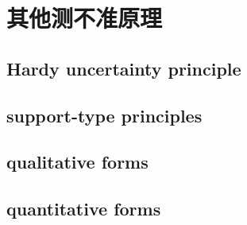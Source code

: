 \section{其他测不准原理}
\label{b2:sec:2003}


\subsection{Hardy uncertainty principle}
\label{b2:subsec:200301}

\subsection{support-type principles}
\label{b2:subsec:200302}

\subsection{qualitative forms}
\label{b2:subsec:200303}

\subsection{quantitative forms}
\label{b2:subsec:200304}


